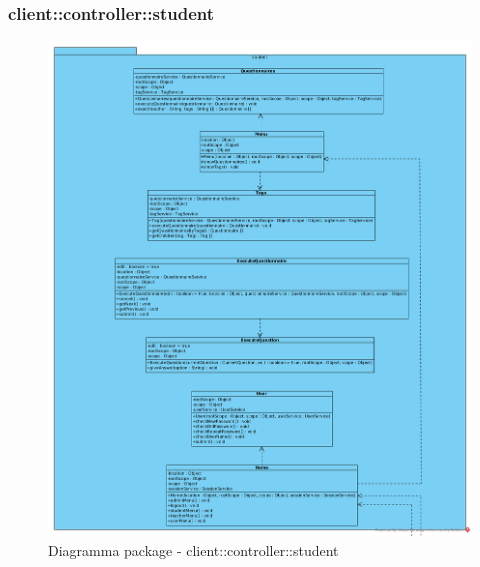 \subsubsection{client::controller::student}
\begin{center}
		\begin{figure}[H]
			\centering \includegraphics[scale=4, max width=\textwidth, max height=\myheight]{../img/diagrammiClassi/client/controller/student.png}
			\caption{Diagramma package - client::controller::student}
		\end{figure}
	\end{center}\hypertarget{client::controller::student::Home}{}
